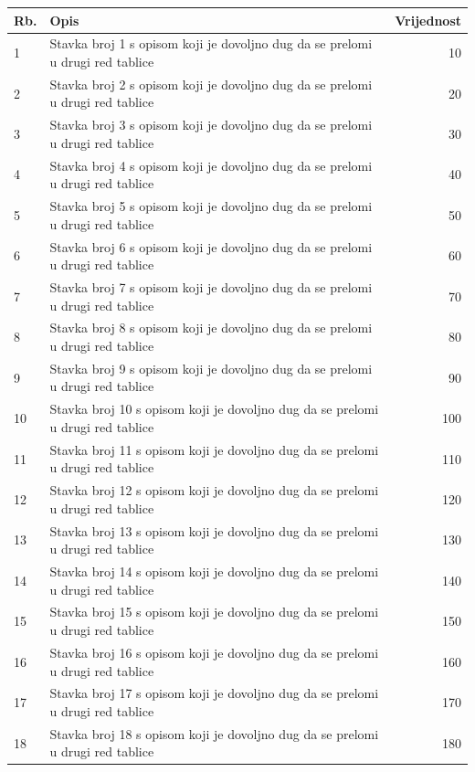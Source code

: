 \documentclass[a4paper]{article}
\begin{document}
\begin{longtable}{|l|p{6cm}|r|}
\hline
Rb. & Opis & Vrijednost \\
\hline
\endhead
1 & Stavka broj 1 s opisom koji je dovoljno dug da se prelomi u drugi red tablice & 10 \\
\hline
2 & Stavka broj 2 s opisom koji je dovoljno dug da se prelomi u drugi red tablice & 20 \\
\hline
3 & Stavka broj 3 s opisom koji je dovoljno dug da se prelomi u drugi red tablice & 30 \\
\hline
4 & Stavka broj 4 s opisom koji je dovoljno dug da se prelomi u drugi red tablice & 40 \\
\hline
5 & Stavka broj 5 s opisom koji je dovoljno dug da se prelomi u drugi red tablice & 50 \\
\hline
6 & Stavka broj 6 s opisom koji je dovoljno dug da se prelomi u drugi red tablice & 60 \\
\hline
7 & Stavka broj 7 s opisom koji je dovoljno dug da se prelomi u drugi red tablice & 70 \\
\hline
8 & Stavka broj 8 s opisom koji je dovoljno dug da se prelomi u drugi red tablice & 80 \\
\hline
9 & Stavka broj 9 s opisom koji je dovoljno dug da se prelomi u drugi red tablice & 90 \\
\hline
10 & Stavka broj 10 s opisom koji je dovoljno dug da se prelomi u drugi red tablice & 100 \\
\hline
11 & Stavka broj 11 s opisom koji je dovoljno dug da se prelomi u drugi red tablice & 110 \\
\hline
12 & Stavka broj 12 s opisom koji je dovoljno dug da se prelomi u drugi red tablice & 120 \\
\hline
13 & Stavka broj 13 s opisom koji je dovoljno dug da se prelomi u drugi red tablice & 130 \\
\hline
14 & Stavka broj 14 s opisom koji je dovoljno dug da se prelomi u drugi red tablice & 140 \\
\hline
15 & Stavka broj 15 s opisom koji je dovoljno dug da se prelomi u drugi red tablice & 150 \\
\hline
16 & Stavka broj 16 s opisom koji je dovoljno dug da se prelomi u drugi red tablice & 160 \\
\hline
17 & Stavka broj 17 s opisom koji je dovoljno dug da se prelomi u drugi red tablice & 170 \\
\hline
18 & Stavka broj 18 s opisom koji je dovoljno dug da se prelomi u drugi red tablice & 180 \\

\end{longtable}
\end{document}
